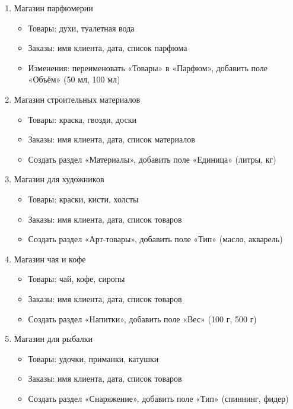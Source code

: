 \documentclass[12pt]{article}
\begin{document}
\begin{enumerate}
	      \newpage

	\item Магазин парфюмерии
	      \begin{itemize}
		      \item Товары: духи, туалетная вода
		      \item Заказы: имя клиента, дата, список парфюма
		      \item Изменения: переименовать «Товары» в «Парфюм», добавить поле «Объём» (50 мл, 100 мл)
	      \end{itemize}

	\item Магазин строительных материалов
	      \begin{itemize}
		      \item Товары: краска, гвозди, доски
		      \item Заказы: имя клиента, дата, список материалов
		      \item Создать раздел «Материалы», добавить поле «Единица» (литры, кг)
	      \end{itemize}

	\item Магазин для художников
	      \begin{itemize}
		      \item Товары: краски, кисти, холсты
		      \item Заказы: имя клиента, дата, список товаров
		      \item Создать раздел «Арт-товары», добавить поле «Тип» (масло, акварель)
	      \end{itemize}

	\item Магазин чая и кофе
	      \begin{itemize}
		      \item Товары: чай, кофе, сиропы
		      \item Заказы: имя клиента, дата, список товаров
		      \item Создать раздел «Напитки», добавить поле «Вес» (100 г, 500 г)
	      \end{itemize}

	\item Магазин для рыбалки
	      \begin{itemize}
		      \item Товары: удочки, приманки, катушки
		      \item Заказы: имя клиента, дата, список товаров
		      \item Создать раздел «Снаряжение», добавить поле «Тип» (спиннинг, фидер)
	      \end{itemize}


\end{enumerate}
\end{document}
